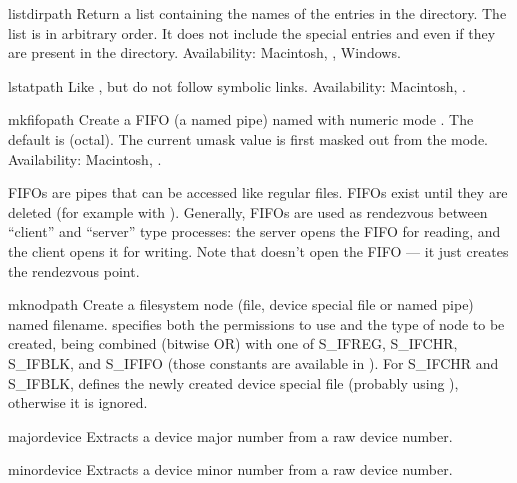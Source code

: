 \begin{funcdesc}{listdir}{path}
Return a list containing the names of the entries in the directory.
The list is in arbitrary order.  It does not include the special
entries  and  even if they are present in the
directory.
Availability: Macintosh, \UNIX, Windows.

\end{funcdesc}

\begin{funcdesc}{lstat}{path}
Like , but do not follow symbolic links.
Availability: Macintosh, \UNIX.
\end{funcdesc}

\begin{funcdesc}{mkfifo}{path}
Create a FIFO (a named pipe) named  with numeric mode
.  The default  is  (octal).  The current
umask value is first masked out from the mode.
Availability: Macintosh, \UNIX.

FIFOs are pipes that can be accessed like regular files.  FIFOs exist
until they are deleted (for example with ).
Generally, FIFOs are used as rendezvous between ``client'' and
``server'' type processes: the server opens the FIFO for reading, and
the client opens it for writing.  Note that 
doesn't open the FIFO --- it just creates the rendezvous point.
\end{funcdesc}

\begin{funcdesc}{mknod}{path}
Create a filesystem node (file, device special file or named pipe)
named filename.  specifies both the permissions to use and
the type of node to be created, being combined (bitwise OR) with one
of S_IFREG, S_IFCHR, S_IFBLK, and S_IFIFO (those constants are
available in ). For S_IFCHR and S_IFBLK, 
defines the newly created device special file (probably using
), otherwise it is ignored.
\end{funcdesc}

\begin{funcdesc}{major}{device}
Extracts a device major number from a raw device number.
\end{funcdesc}

\begin{funcdesc}{minor}{device}
Extracts a device minor number from a raw device number.
\end{funcdesc}

